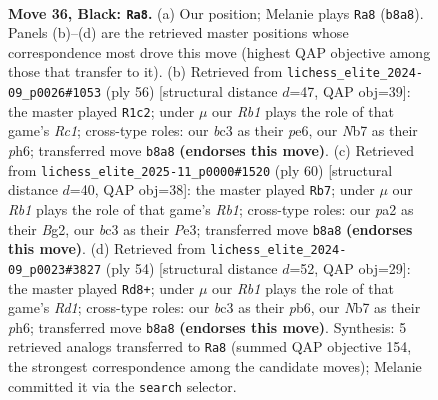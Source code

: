 \documentclass[11pt]{article}
\begin{document}
\clearpage

\begin{figure}[p]\centering
\begin{subfigure}{0.46\textwidth}\centering
\resizebox{\linewidth}{!}{%
\newchessgame
\chessboard[
  setfen={1rr5/pn3p1k/1p2p1pp/8/2P5/N1B1P2P/PR3PP1/5K1R b - - 2 36},
  showmover=false,
  pgfstyle=straightmove, color=movearrow, markmove={b8-a8}
]}
\caption{}
\end{subfigure}\hfill
\begin{subfigure}{0.46\textwidth}\centering
\resizebox{\linewidth}{!}{%
\newchessgame
\chessboard[
  setfen={2r5/p3kp2/2prpp1p/8/2RP4/4P2P/P3KPP1/2R5 w - - 7 29},
  showmover=false,
  pgfstyle=straightmove, color=movearrow, markmove={c1-c2}
]}
\caption{}
\end{subfigure}
\\[4pt]
\begin{subfigure}{0.46\textwidth}\centering
\resizebox{\linewidth}{!}{%
\newchessgame
\chessboard[
  setfen={2r3k1/3b1pp1/4p2p/r7/2pP4/p3P1P1/P4PBP/1RR3K1 w - - 0 31},
  showmover=false,
  pgfstyle=straightmove, color=movearrow, markmove={b1-b7}
]}
\caption{}
\end{subfigure}\hfill
\begin{subfigure}{0.46\textwidth}\centering
\resizebox{\linewidth}{!}{%
\newchessgame
\chessboard[
  setfen={6k1/p3rp2/1p2pp1p/2r5/P1P5/1P4P1/5PP1/3RR1K1 w - - 1 28},
  showmover=false,
  pgfstyle=straightmove, color=movearrow, markmove={d1-d8}
]}
\caption{}
\end{subfigure}
\caption{\textbf{Move 36, Black: \texttt{Ra8}.} (a) Our position; Melanie plays \texttt{Ra8} (\texttt{b8a8}). Panels (b)--(d) are the retrieved master positions whose correspondence most drove this move (highest QAP objective among those that transfer to it). (b) Retrieved from \texttt{lichess\_elite\_2024-09\_p0026\#1053} (ply 56) [structural distance $d$=47, QAP obj=39]: the master played \texttt{R1c2}; under $\mu$ our \emph{Rb1} plays the role of that game's \emph{Rc1}; cross-type roles: our \emph{b}c3 as their \emph{p}e6, our \emph{N}b7 as their \emph{p}h6; transferred move \texttt{b8a8} \textbf{(endorses this move)}. (c) Retrieved from \texttt{lichess\_elite\_2025-11\_p0000\#1520} (ply 60) [structural distance $d$=40, QAP obj=38]: the master played \texttt{Rb7}; under $\mu$ our \emph{Rb1} plays the role of that game's \emph{Rb1}; cross-type roles: our \emph{p}a2 as their \emph{B}g2, our \emph{b}c3 as their \emph{P}e3; transferred move \texttt{b8a8} \textbf{(endorses this move)}. (d) Retrieved from \texttt{lichess\_elite\_2024-09\_p0023\#3827} (ply 54) [structural distance $d$=52, QAP obj=29]: the master played \texttt{Rd8+}; under $\mu$ our \emph{Rb1} plays the role of that game's \emph{Rd1}; cross-type roles: our \emph{b}c3 as their \emph{p}b6, our \emph{N}b7 as their \emph{p}h6; transferred move \texttt{b8a8} \textbf{(endorses this move)}. Synthesis: 5 retrieved analogs transferred to \texttt{Ra8} (summed QAP objective 154, the strongest correspondence among the candidate moves); Melanie committed it via the \texttt{search} selector.}
\label{fig:thought-m71}
\end{figure}
\end{document}
